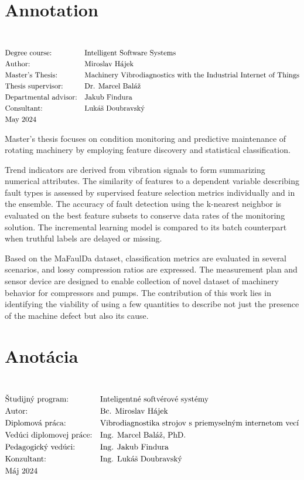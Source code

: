 \thispagestyle{empty}
\section*{Annotation}
\UniversityEN \\
\uppercase{\FacultyEN}
\vspace{-8pt}
{\setlength{\mathindent}{0cm}
\begin{align*}
&\text{Degree course:} && \text{\StudyProgrammeEN} \\
&\text{Author:} && \text{\AuthorEN} \\
&\text{\ThesisEN:} && \text{\TitleEN} \\
&\text{Thesis supervisor:} && \text{\SupervisorEN} \\
&\text{Departmental advisor:} && \text{\DepartmentalAdvisorEN} \\
&\text{Consultant:} && \text{\ConsultantEN} \\
&\text{\DateEN}
\end{align*}}

Master's thesis focuses on condition monitoring and predictive maintenance of rotating machinery by employing feature discovery and statistical classification. 

Trend indicators are derived from vibration signals to form summarizing numerical attributes. The similarity of features to a dependent variable describing fault types is assessed by supervised feature selection metrics individually and in the ensemble. The accuracy of fault detection using the k-nearest neighbor is evaluated on the best feature subsets to conserve data rates of the monitoring solution. The incremental learning model is compared to its batch counterpart when truthful labels are delayed or missing. 

Based on the MaFaulDa dataset, classification metrics are evaluated in several scenarios, and lossy compression ratios are expressed. The measurement plan and sensor device are designed to enable collection of novel dataset of machinery behavior for compressors and pumps. The contribution of this work lies in identifying the viability of using a few quantities to describe not just the presence of the machine defect but also its cause.
\emptypage 

\thispagestyle{empty}
\section*{Anotácia}
\University \\
\uppercase{\Faculty}
\vspace{-8pt}
{\setlength{\mathindent}{0cm}
\begin{align*}
&\text{Študijný program:} && \text{\StudyProgramme} \\
&\text{Autor:} && \text{\Author} \\
&\text{\Thesis:} && \text{\Title} \\
&\text{Vedúci diplomovej práce:} && \text{\Supervisor} \\
&\text{Pedagogický vedúci:} && \text{\DepartmentalAdvisor} \\
&\text{Konzultant:} && \text{\Consultant} \\
&\text{\Date}
\end{align*}}

